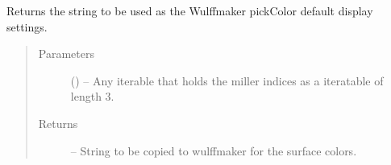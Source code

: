 \documentclass[letterpaper,10pt,english,openany,oneside]{sphinxmanual}
\begin{document}

\begin{fulllineitems}
\label{\detokenize{index:ogre.utils.wulffmaker.wulffmaker_color}}
Returns the string to be used as the Wulffmaker pickColor default display
settings.
\begin{quote}\begin{description}
\item[{Parameters}] \leavevmode
{} () -- Any iterable that holds the miller indices as a iteratable of length 3.

\item[{Returns}] \leavevmode
{} -- String to be copied to wulffmaker for the surface colors.

\end{description}\end{quote}

\end{fulllineitems}

\end{document}
